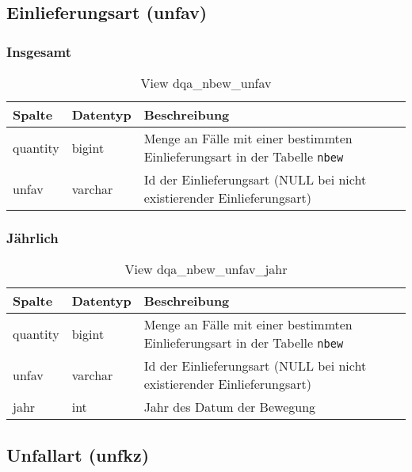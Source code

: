 \subsection{Einlieferungsart (unfav)} \label{subsec:bewUnfav}

\subsubsection{Insgesamt} \label{subsubsec:bewUnfavI}

\begin{table}[ht]
	\centering   
	\caption{View dqa\_nbew\_unfav}
	\label{tab:bewUnfavI}
	\begin{tabular}{||l|l|p{10cm}||}   		
		\hline
		Spalte & Datentyp & Beschreibung \\ [0.5ex]
		\hline\hline
		quantity & bigint & Menge an Fälle mit einer bestimmten Einlieferungsart in der Tabelle \texttt{nbew} \\
		\hline
		unfav & varchar & Id der Einlieferungsart (NULL bei nicht existierender Einlieferungsart)\\
		\hline
		
	\end{tabular}
\end{table}

\subsubsection{Jährlich} \label{subsubsec:bewUnfavJ}

\begin{table}[ht]
	\centering   
	\caption{View dqa\_nbew\_unfav\_jahr}
	\label{tab:bewUnfavJ}
	\begin{tabular}{||l|l|p{10cm}||}
		\hline
		Spalte & Datentyp & Beschreibung \\ [0.5ex]
		\hline\hline
		quantity & bigint & Menge an Fälle mit einer bestimmten Einlieferungsart in der Tabelle \texttt{nbew}\\
		\hline
		unfav & varchar & Id der Einlieferungsart (NULL bei nicht existierender Einlieferungsart)\\
		\hline
		jahr & int &  Jahr des Datum der Bewegung \\
		\hline		
	\end{tabular}
\end{table}

\subsection{Unfallart (unfkz)} \label{subsec:bewUnfkz}

